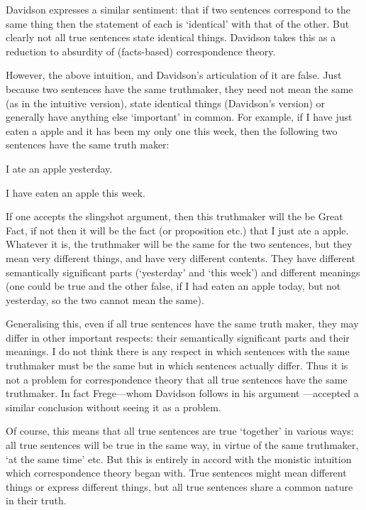 Davidson expresses a similar sentiment: that if two sentences correspond to the same thing then the statement of each is `identical' with that of the other.
But clearly not all true sentences state identical things.
Davidson takes this as a reduction to absurdity of (facts-based) correspondence theory. %
\parencite[750]{Davidson_1969}

However, the above intuition, and Davidson's articulation of it are false.
Just because two sentences have the same truthmaker, they need not mean the same (as in the intuitive version), state identical things (Davidson's version) or generally have anything else `important' in common.
For example, if I have just eaten a apple and it has been my only one this week, then the following two sentences have the same truth maker:

	\begin{example} \label{yesterday}
	I ate an apple yesterday.
	\end{example}

	\begin{example} \label{week}
	I have eaten an apple this week.
	\end{example}

If one accepts the slingshot argument, then this truthmaker will the be Great Fact, if not then it will be the fact (or proposition etc.) that I just ate a apple.
Whatever it is, the truthmaker will be the same for the two sentences, but they mean very different things, and have very different contents.
They have different semantically significant parts (`yesterday' and `this week') and different meanings (one could be true and the other false, if I had eaten an apple today, but not yesterday, so the two cannot mean the same).

Generalising this, even if all true sentences have the same truth maker, they may differ in other important respects: their semantically significant parts and their meanings.
I do not think there is any respect in which sentences with the same truthmaker must be the same but in which sentences actually differ.
Thus it is not a problem for correspondence theory that all true sentences have the same truthmaker.
In fact Frege---whom Davidson follows in his argument \parencite[750]{Davidson_1969}---accepted a similar conclusion without seeing it as a problem.
\parencite[216]{Frege_1948}

Of course, this means that all true sentences are true `together' in various ways: all true sentences will be true in the same way, in virtue of the same truthmaker, `at the same time' etc.
But this is entirely in accord with the monistic intuition which correspondence theory began with.
True sentences might mean different things or express different things, but all true sentences share a common nature in their truth.

